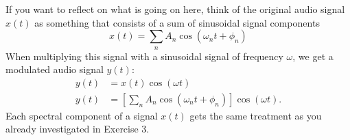 \begin{enumerate}
\begin{itemize}
\end{itemize}
If you want to reflect on what is going on here, think of the original
audio signal $x(t)$ as something that consists of a sum of sinusoidal
signal components
\begin{equation}
    x(t) = \sum_{n} A_n \cos(\omega_n t + \phi_n)
\end{equation}
When multiplying this signal with a sinusoidal signal of frequency $\omega$, we get a modulated audio signal $y(t)$:
\begin{align}
y(t) &= x(t) \cos(\omega t)\\
  y(t) &= \left[\sum_{n} A_n \cos(\omega_n t + \phi_n)\right] \cos(\omega t).
\end{align}
Each spectral component of a signal $x(t)$ gets the same treatment as you already investigated in Exercise 3.

\end{enumerate}